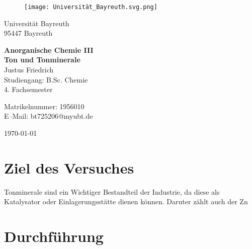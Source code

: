 \documentclass[12pt, a4paper]{article}
\begin{document}
\begin{figure}
    \texttt{[image: Universität\_Bayreuth.svg.png]}
\end{figure}



{\raggedright Universität Bayreuth\\  95447 Bayreuth}


\vspace{5cm}

\begin{center}
{\LARGE\bf{Anorganische Chemie III}} \\  
\vspace{1cm}
{\Large\bf{Ton und Tonminerale}}\\
\vspace{0.5cm}
{\large Justus Friedrich\\}
{Studiengang: B.Sc. Chemie\\}
{4. Fachsemester}
\end{center}





\thispagestyle{empty}
\begin{center}
{\small Matrikelnummer: 1956010 \\
E–Mail:  bt725206@myubt.de}
\end{center}

\vspace{5cm}

\begin{center}
  \today
\end{center}

\newpage
\tableofcontents
\thispagestyle{empty}


\newpage
\setcounter{page}{1}
\section{Ziel des Versuches}
{Tonminerale sind ein Wichtiger Bestandteil der Industrie, da diese als Katalysator oder Einlagerungsstätte dienen können. Daruter zählt auch 
der Zn



\cite{Skript}



}






\newpage
\section{Durchführung}
\end{document}
